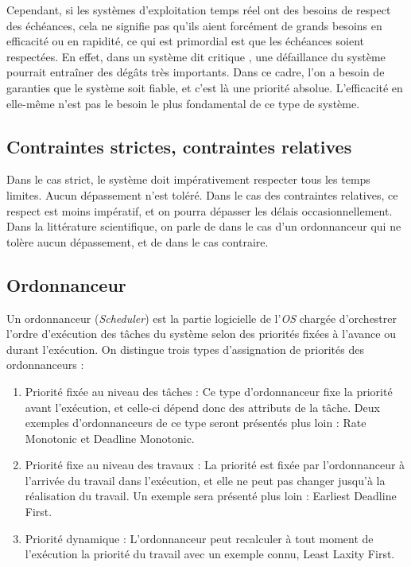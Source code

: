 	Cependant, si les systèmes d'exploitation temps réel ont des besoins de respect des échéances, 
	cela ne signifie pas qu'ils aient forcément de grands besoins en efficacité ou en rapidité, ce qui 
	est primordial est que les échéances soient respectées. 
	En effet, dans un système dit \og critique\fg{} , une défaillance du système pourrait entraîner des dégâts 
	très importants. 
	Dans ce cadre, l'on a besoin de garanties que le système soit fiable, et c'est là une priorité absolue.
	L'efficacité en elle-même n'est pas le besoin le plus fondamental de ce type de système.\medskip
	
	\subsection{Contraintes strictes, contraintes relatives} 
	Dans le cas strict, le système doit impérativement respecter tous les temps limites. Aucun dépassement n'est toléré. Dans le cas des contraintes relatives, ce respect 
	est moins impératif, et on pourra dépasser les délais occasionnellement. \medskip
	Dans la littérature scientifique, on parle de  dans le cas d'un ordonnanceur 
	qui ne tolère aucun dépassement, et de  dans le cas contraire.
	
	\subsection{Ordonnanceur}
	Un ordonnanceur (\textit{Scheduler}) est la partie logicielle de 
	l'\textit{OS} chargée d'orchestrer l'ordre d'exécution des tâches du système 
	selon des priorités fixées à l'avance ou durant l'exécution. 
	On distingue trois types d'assignation de priorités des ordonnanceurs :
	
	
	\begin{enumerate}
		\item Priorité fixée au niveau des tâches : Ce type d'ordonnanceur fixe la priorité 
		avant l'exécution, et celle-ci dépend donc des attributs de la tâche. 
		Deux exemples d'ordonnanceurs de ce type seront présentés plus loin : Rate Monotonic et 
		Deadline Monotonic.
		\item Priorité fixe au niveau des travaux : La priorité est fixée par l'ordonnanceur à l'arrivée du travail 
		dans l'exécution, et elle ne peut pas changer jusqu'à la réalisation du travail. Un exemple sera présenté plus loin : Earliest Deadline First.
		\item Priorité dynamique : L'ordonnanceur peut recalculer à tout moment de l'exécution 
		la priorité du travail avec un exemple connu, Least Laxity First.
	\end{enumerate}
	
